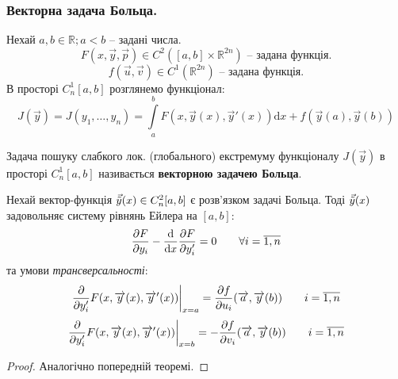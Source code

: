 \subsubsection{Векторна задача Больца.}
Нехай $a,b \in \mathbb{R}; a<b$ -- задані числа.
$$
F(x,\overrightarrow{y}, \overrightarrow{p}) \in C^2([a,b]\times \mathbb{R}^{2n}) \text{ -- задана функція.}
$$
$$
f(\overrightarrow{u}, \overrightarrow{v})\in C^1(\mathbb{R}^{2n}) \text{ -- задана функція.}
$$
В просторі $C_n^1[a,b]$ розглянемо функціонал:
$$
J(\overrightarrow{y}) = J(y_1, \dots , y_n) =  \int\limits_{a}^{b}{ F(x, \overrightarrow{y}(x), \overrightarrow{y}'(x))} \mathrm{d} x + f(\overrightarrow{y}(a), \overrightarrow{y}(b))
$$
\begin{defo}
 Задача пошуку слабкого лок. (глобального) екстремуму функціоналу $J(\overrightarrow{y})$ в просторі $C_n^1 [a,b]$ називається \textbf{ векторною задачею Больца}.
\end{defo}
\begin{boxteo}
 Нехай вектор-функція $\vec{\tilde{y}} (x) \in C_n^2 [a,b]$ є розв'язком задачі Больца. Тоді $\vec{\tilde{y}} (x)$ задовольняє систему рівнянь Ейлера на $[a,b]$:
 $$
 \frac{\partial F}{\partial y_i} - \frac{\mathrm{d}}{ \mathrm{d} x} \frac{\partial F}{\partial y_i'}  = 0 \qquad \forall i = \overline{1, n}
 $$
 та умови \textit{трансверсальності}:
 $$
 \frac{\partial}{\partial y_i'} F(x, \overrightarrow{y}(x),  \overrightarrow{y}'(x))\bigg|_{x =a} = \frac{\partial f}{\partial u_i} (\overrightarrow{a}, \overrightarrow{y}(b)) \qquad i = \overline{1,n}
 $$
 $$
  \frac{\partial}{\partial y_i'} F(x, \overrightarrow{y}(x),  \overrightarrow{y}'(x))\bigg|_{x =b} =- \frac{\partial f}{\partial v_i} (\overrightarrow{a}, \overrightarrow{y}(b)) \qquad i = \overline{1,n}
 $$
 \begin{proof}
  Аналогічно попередній теоремі.
 \end{proof}
\end{boxteo}

